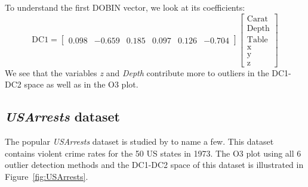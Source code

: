 \documentclass[11pt]{article}
\begin{document}
To understand the first DOBIN vector, we look at its coefficients:
\begin{equation}\label{eq:ResWithVis2}
    \text{DC1} = \begin{bmatrix}
    0.098 & -0.659 &  0.185 & 0.097  & 0.126 & -0.704  
    \end{bmatrix}
    \begin{bmatrix}
    \text{Carat} \\
    \text{Depth} \\
    \text{Table} \\
    \text{x} \\
    \text{y} \\
    \text{z}
    \end{bmatrix}
\end{equation}
We see that the variables \textit{z} and \textit{Depth} contribute more  to  outliers in the DC1-DC2 space as well as in the O3 plot. 


\subsection{\textit{USArrests} dataset}\label{sec:ResWithVis3}
The popular \textit{USArrests} dataset  is studied by \cite{bailey1995interactive, sarkar2008labels, yaminiviolent} to name a few. This dataset contains violent crime rates for the 50 US states in 1973. The O3 plot using all $6$ outlier detection methods and the DC1-DC2 space of this dataset is illustrated in Figure~\ref{fig:USArrests}. 
\end{document}
